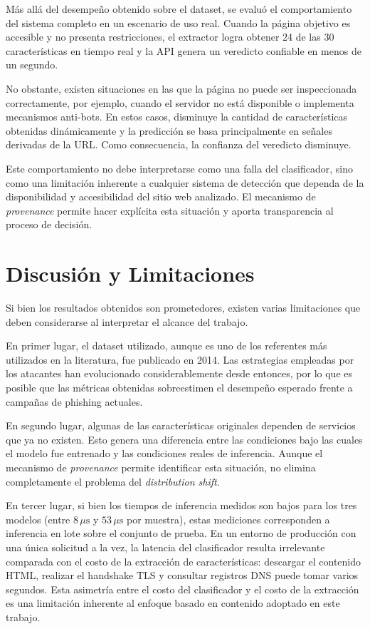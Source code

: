 \documentclass[conference]{IEEEtran}
\begin{document}
Más allá del desempeño obtenido sobre el dataset, se evaluó el comportamiento del sistema completo en un escenario de uso real. Cuando la página objetivo es accesible y no presenta restricciones, el extractor logra obtener 24 de las 30 características en tiempo real y la API genera un veredicto confiable en menos de un segundo.

No obstante, existen situaciones en las que la página no puede ser inspeccionada correctamente, por ejemplo, cuando el servidor no está disponible o implementa mecanismos anti-bots. En estos casos, disminuye la cantidad de características obtenidas dinámicamente y la predicción se basa principalmente en señales derivadas de la URL. Como consecuencia, la confianza del veredicto disminuye.

Este comportamiento no debe interpretarse como una falla del clasificador, sino como una limitación inherente a cualquier sistema de detección que dependa de la disponibilidad y accesibilidad del sitio web analizado. El mecanismo de \textit{provenance} permite hacer explícita esta situación y aporta transparencia al proceso de decisión.

\section{Discusión y Limitaciones}
Si bien los resultados obtenidos son prometedores, existen varias limitaciones que deben considerarse al interpretar el alcance del trabajo.

En primer lugar, el dataset utilizado, aunque es uno de los referentes más utilizados en la literatura, fue publicado en 2014. Las estrategias empleadas por los atacantes han evolucionado considerablemente desde entonces, por lo que es posible que las métricas obtenidas sobreestimen el desempeño esperado frente a campañas de phishing actuales.

En segundo lugar, algunas de las características originales dependen de servicios que ya no existen. Esto genera una diferencia entre las condiciones bajo las cuales el modelo fue entrenado y las condiciones reales de inferencia. Aunque el mecanismo de \textit{provenance} permite identificar esta situación, no elimina completamente el problema del \textit{distribution shift}.

En tercer lugar, si bien los tiempos de inferencia medidos son bajos para los tres modelos (entre $8\,\mu\text{s}$ y $53\,\mu\text{s}$ por muestra), estas mediciones corresponden a inferencia en lote sobre el conjunto de prueba. En un entorno de producción con una única solicitud a la vez, la latencia del clasificador resulta irrelevante comparada con el costo de la extracción de características: descargar el contenido HTML, realizar el handshake TLS y consultar registros DNS puede tomar varios segundos. Esta asimetría entre el costo del clasificador y el costo de la extracción es una limitación inherente al enfoque basado en contenido adoptado en este trabajo.
\end{document}
